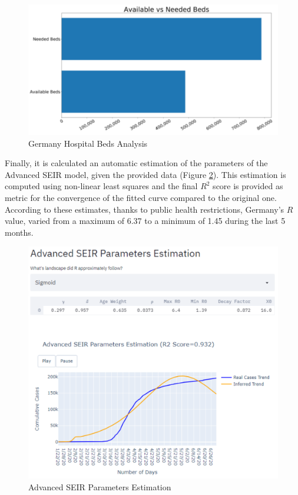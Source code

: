 \vspace{-0.3cm}
\begin{figure}[ht!]%
    \centering
    \includegraphics[width=0.65\linewidth]{latex/images/cov_g3.pdf}
    \vspace{-0.3cm}
    \caption{Germany Hospital Beds Analysis}
    \label{germ_bed}
    \vspace{-0.3cm}
\end{figure}

\vspace{-0.3cm}
Finally, it is calculated an automatic estimation of the parameters of the Advanced SEIR model, given the provided data (Figure \ref{par_est}). This estimation is computed using non-linear least squares and the final $R^{2}$ score is provided as metric for the convergence of the fitted curve compared to the original one. According to these estimates, thanks to public health restrictions, Germany's $R$ value, varied from a maximum of 6.37 to a minimum of 1.45 during the last 5 months.

\begin{figure}[ht!]%
    \centering
    \includegraphics[width=0.75\linewidth]{latex/images/germ_params.pdf}
    \caption{Advanced SEIR Parameters Estimation}
    \label{par_est}
\end{figure}

